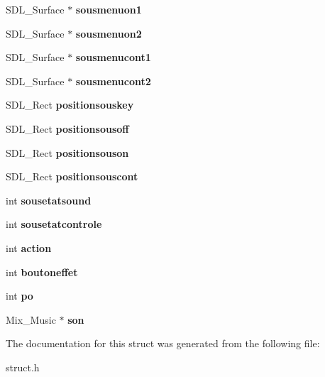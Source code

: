 \begin{DoxyCompactItemize}
\item 
\mbox{\label{structmenu_a009c935c1538af4506965a33d1770c8d}} 
S\+D\+L\+\_\+\+Surface $\ast$ {\bfseries sousmenuon1}
\item 
\mbox{\label{structmenu_acad5806905506c43e78855b487f2219c}} 
S\+D\+L\+\_\+\+Surface $\ast$ {\bfseries sousmenuon2}
\item 
\mbox{\label{structmenu_abecc063e0dddd1da908c3c20806f6c54}} 
S\+D\+L\+\_\+\+Surface $\ast$ {\bfseries sousmenucont1}
\item 
\mbox{\label{structmenu_a499f9acb302997049721c4bb5952187e}} 
S\+D\+L\+\_\+\+Surface $\ast$ {\bfseries sousmenucont2}
\item 
\mbox{\label{structmenu_a47bca0b622003161ea5f728546f0b37f}} 
S\+D\+L\+\_\+\+Rect {\bfseries positionsouskey}
\item 
\mbox{\label{structmenu_abbb318ca62860d0a710014133ebb17a6}} 
S\+D\+L\+\_\+\+Rect {\bfseries positionsousoff}
\item 
\mbox{\label{structmenu_a8c8864c2fed8fcdae8dd034ce0b2d3ae}} 
S\+D\+L\+\_\+\+Rect {\bfseries positionsouson}
\item 
\mbox{\label{structmenu_ae757af5460bd86bc332fcef36dad21f7}} 
S\+D\+L\+\_\+\+Rect {\bfseries positionsouscont}
\item 
\mbox{\label{structmenu_a61622878692c58478100d22e910664bc}} 
int {\bfseries sousetatsound}
\item 
\mbox{\label{structmenu_ac99773aa82a428b907249821c05f4c17}} 
int {\bfseries sousetatcontrole}
\item 
\mbox{\label{structmenu_adc5b170275d8df6e6663eeab81097be5}} 
int {\bfseries action}
\item 
\mbox{\label{structmenu_af7f753e6bbf9f58213e9d2007a59e0cf}} 
int {\bfseries boutoneffet}
\item 
\mbox{\label{structmenu_a106b1051a6c9a136cc7d04d4ee0538e3}} 
int {\bfseries po}
\item 
\mbox{\label{structmenu_a5b4aabde6699af1ef12391dfeb6389d6}} 
Mix\+\_\+\+Music $\ast$ {\bfseries son}
\end{DoxyCompactItemize}


The documentation for this struct was generated from the following file\+:\begin{DoxyCompactItemize}
\item 
struct.\+h\end{DoxyCompactItemize}
